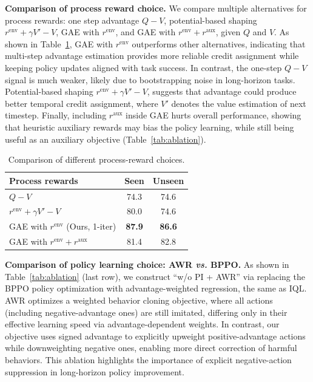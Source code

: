 \documentclass{article}
\theoremstyle{plain}
\theoremstyle{definition}
\theoremstyle{remark}
\begin{document}
\textbf{Comparison of process reward choice.} We compare multiple alternatives for process rewards: one step advantage $Q-V$, potential-based shaping $r^{\text{env}}+\gamma V'-V$, GAE with $r^{\text{env}}$, and GAE with $r^{\text{env}}{+}r^{\text{aux}}$, given $Q$ and $V$.
As shown in Table~\ref{tab:process_reward_choice}, GAE with $r^{\text{env}}$ outperforms other alternatives, indicating that multi-step advantage estimation provides more reliable credit assignment while keeping policy updates aligned with task success. In contrast, the one-step $Q-V$ signal is much weaker, likely due to bootstrapping noise in long-horizon tasks. Potential-based shaping $r^{\text{env}}+\gamma V'-V$, suggests that advantage could produce better temporal credit assignment, where $V'$ denotes the value estimation of next timestep.  Finally, including $r^{\text{aux}}$ inside GAE hurts overall performance, showing that heuristic auxiliary rewards may bias the policy learning, while still being useful as an auxiliary objective (Table~\ref{tab:ablation}).

\begin{table}[t]
\centering
\small
\caption{Comparison of different process-reward choices.}
\label{tab:process_reward_choice}
\begin{tabular}{lcc}
\toprule
{Process rewards} & {Seen} & {Unseen} \\
\midrule
$Q-V$& 74.3 & 74.6 \\
$r^{\text{env}} +\gamma V' - V$ & 80.0 & 74.6 \\
GAE with $r^{\text{env}}$ (Ours, 1-iter)  & \textbf{87.9} & \textbf{86.6} \\
GAE with $r^{\text{env}} + r^{\text{aux}}$  & 81.4 & 82.8 \\
\bottomrule
\end{tabular}
\end{table}

\textbf{Comparison of policy learning choice: AWR \textit{vs.} BPPO.}
As shown in Table~\ref{tab:ablation} (last row), we construct ``w/o PI + AWR'' via replacing the BPPO policy optimization with advantage-weighted regression, the same as IQL.  AWR optimizes a weighted behavior cloning objective, where all actions (including negative-advantage ones) are still imitated, differing only in their effective learning speed via advantage-dependent weights. In contrast, our objective uses signed advantage to explicitly upweight positive-advantage actions while downweighting negative ones, enabling more direct correction of harmful behaviors. This ablation highlights the importance of explicit negative-action suppression in long-horizon policy improvement.
\end{document}
